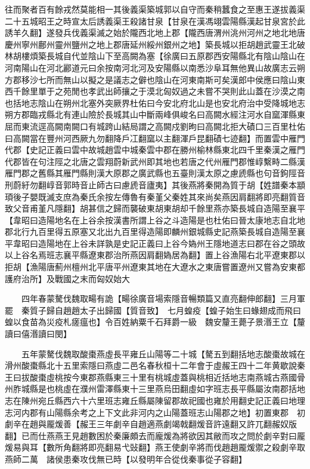 往而聚者百有餘戎然莫能相一其後義渠築城郭以自守而秦稍蠶食之至惠王遂拔義渠二十五城昭王之時宣太后誘義渠王殺諸甘泉【甘泉在漢馮翊雲陽縣漢起甘泉宮於此誘羊久翻】遂發兵伐義渠滅之始於隴西北地上郡【隴西唐渭州洮州河州之地北地唐慶州寧州鄜州靈州鹽州之地上郡唐延州綏州銀州之地】築長城以拒胡趙武靈王北破林胡樓煩築長城自代並陰山下至高闕為塞【徐廣曰五原郡西安陽縣北有陰山陰山在河南陽山在河北酈道元曰余按南河北河及安陽縣以南悉沙阜耳無他異山故廣志云朔方郡移沙七所而無山以擬之是議志之僻也陰山在河東南斯可矣漢郎中侯應曰陰山東西千餘里單于之苑閒也孝武出師攘之于漠北匈奴過之未嘗不哭則此山蓋在沙漠之南也括地志陰山在朔州北塞外突厥界杜佑曰今安北府北山是也安北府治中受降城地志朔方郡臨戎縣北有連山險於長城其山中斷兩峰俱峻名曰高闕水經注河水自窳渾縣東屈而東流逕高闕南闕口有城跨山結局謂之高闕戍劉昫曰高闕北拒大磧口三百里杜佑曰高闕當在豐州河西厥九勿翻降戶冮翻窳以主翻渾戶昆翻磧七迹翻】而置雲中雁門代郡【史記正義曰雲中故城趙雲中城秦雲中郡在勝州榆林縣東北四千里秦漢之雁門代郡皆在句注陘之北唐之雲翔蔚新武州即其地也若唐之代州雁門郡惟崞繫畤二縣漢雁門郡之舊縣其雁門縣則漢大原郡之廣武縣也五臺則漢太原之慮虒縣也句音鉤陘音刑蔚紆勿翻崞音郭時音止師古曰慮虒音廬夷】其後燕將秦開為質于胡【姓譜秦本顓頊後子嬰既滅支庶為秦氏余按左傳魯有秦堇父秦姓其來尚矣燕因肩翻將即亮翻質音致父音甫堇凡隱翻】胡甚信之歸而襲破東胡東胡却千餘里燕亦築長城自造陽至襄平【韋昭曰造陽地名在上谷余按漢書所謂上谷之斗造陽是也杜佑曰晉太康地志自北地郡北行九百里得五原塞又北出九百里得造陽即麟州銀城縣史記燕築長城自造陽至襄平韋昭曰造陽地在上谷未詳孰是史記正義曰上谷今媯州王隱地道志曰郡在谷之頭故以上谷名焉班志襄平縣遼東郡治所燕因肩翻媯居為翻】置上谷漁陽右北平遼東郡以拒胡【漁陽唐薊州檀州北平唐平州遼東其地在大遼水之東唐嘗置遼州又嘗為安東都護府治所】及戰國之末而匈奴始大

　　四年春蒙驁伐魏取畼有詭【畼徐廣音場索隱音暢類篇又直亮翻伸郎翻】三月軍罷　秦質子歸自趙趙太子出歸國【質音致】　七月蝗疫【蝗子始生曰蝝翅成而飛曰蝗以食苗為災疫札瘥瘟也】令百姓納粟千石拜爵一級　魏安釐王薨子景湣王立【釐讀曰僖湣讀曰閔】

　　五年蒙驁伐魏取酸棗燕虛長平雍丘山陽等二十城【驁五到翻括地志酸棗故城在滑州酸棗縣北十五里索隱曰燕虛二邑名春秋桓十二年會于虛赧王四十二年黄歇說秦王曰拔酸棗虛桃按今東郡燕縣東三十里有桃城虛蓋與桃相近括地志南燕城古燕國骨州胙城縣是也桃虛在濮州雷澤縣東十三里燕烏田翻虛如字班志長平縣屬汝南郡括地志在陳州宛丘縣西六十六里班志雍丘縣屬陳留郡故祀國也雍於用翻史記正義曰地理志河内郡有山陽縣余考之上下文此非河内之山陽蓋班志山陽郡之地】初置東郡　初劇辛在趙與龎煖善【赧王三年劇辛自趙適燕劇竭戟翻煖音許遠翻又許兀翻赧奴版翻】已而仕燕燕王見趙數困於秦廉頗去而龐煖為將欲因其敝而攻之問於劇辛對曰龎煖易與耳【數所角翻將即亮翻易弋䜴翻】燕王使劇辛將而伐趙趙龎煖禦之殺劇辛取燕師二萬　諸侯患秦攻伐無已時【以發明年合從伐秦事從子容翻】

